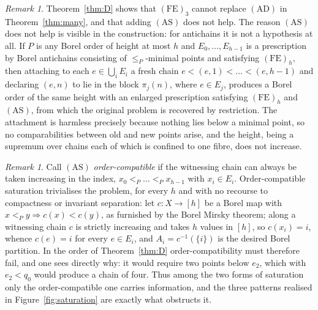 \documentclass[11pt,reqno]{amsart}
\theoremstyle{plain}
\theoremstyle{definition}
\theoremstyle{remark}
\newtheorem{remark}[theorem]{Remark}
\begin{document}
\begin{remark}
\label{rem:AS-free}
Theorem~\ref{thm:D} shows that $\mathrm{(FE)}_3$ cannot replace
$\mathrm{(AD)}$ in Theorem~\ref{thm:many}, and that adding $\mathrm{(AS)}$
does not help. The reason $\mathrm{(AS)}$ does not help is visible in the
construction: for antichains it is not a hypothesis at all. If $P$ is any
Borel order of height at most $h$ and $E_0,\dots,E_{h-1}$ is a prescription by
Borel antichains consisting of $\le_P$-minimal points and satisfying
$\mathrm{(FE)}_h$, then attaching to each $e\in\bigcup_iE_i$ a fresh chain
$e<(e,1)<\dots<(e,h-1)$ and declaring $(e,n)$ to lie in the block
$\pi_j(n)$, where $e\in E_j$, produces a Borel order of the same height with
an enlarged prescription satisfying $\mathrm{(FE)}_h$ and $\mathrm{(AS)}$,
from which the original problem is recovered by restriction. The attachment is
harmless precisely because nothing lies below a minimal point, so no
comparabilities between old and new points arise, and the height, being a
supremum over chains each of which is confined to one fibre, does not
increase.
\end{remark}

\begin{remark}
\label{rem:order-compatible}
Call $\mathrm{(AS)}$ \emph{order-compatible} if the witnessing chain can
always be taken increasing in the index, $x_0<_P\dots<_Px_{h-1}$ with
$x_i\in E_i$. Order-compatible saturation trivialises the problem, for every
$h$ and with no recourse to compactness or invariant separation: let
$c:X\to[h]$ be a Borel map with $x<_Py\Rightarrow c(x)<c(y)$, as furnished by
the Borel Mirsky theorem; along a witnessing chain $c$ is strictly increasing
and takes $h$ values in $[h]$, so $c(x_i)=i$, whence $c(e)=i$ for every
$e\in E_i$, and $A_i=c^{-1}(\{i\})$ is the desired Borel partition. In the
order of Theorem~\ref{thm:D} order-compatibility must therefore fail, and one
sees directly why: it would require two points below $e_2$, which with
$e_2<q_0$ would produce a chain of four. Thus among the two forms of
saturation only the order-compatible one carries information, and the three
patterns realised in Figure~\ref{fig:saturation} are exactly what obstructs
it.
\end{remark}
\end{document}

